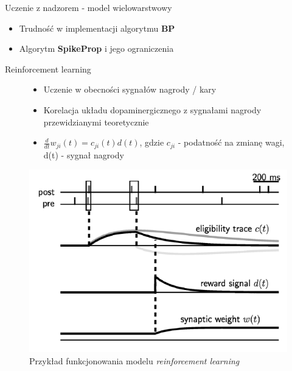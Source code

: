 \documentclass{beamer}
\begin{document}
\begin{frame}{Uczenie z nadzorem - model wielowarstwowy}
\begin{itemize}
	\item Trudność w implementacji algorytmu \textbf{BP}
	\item Algorytm \textbf{SpikeProp} i jego ograniczenia
\end{itemize}
\end{frame}

\begin{frame}{Reinforcement learning}

	\begin{figure}[ht]
		\begin{minipage}{0.48\linewidth}
			\begin{itemize}
				\item Uczenie w obecności sygnałów nagrody / kary
				\item Korelacja układu dopaminergicznego z sygnałami nagrody przewidzianymi teoretycznie
				\item $\frac{d}{dt}w_{ji}(t) = c_{ji}(t)d(t)$, gdzie $c_{ji}$ - podatność na zmianę wagi, d(t) - sygnał nagrody 
			\end{itemize}
		\end{minipage}
		\hfill
		\begin{minipage}{0.48\linewidth}
		\centering
		\includegraphics[width=\textwidth]{reinforcement.png}
		\caption{Przykład funkcjonowania modelu \textit{reinforcement learning}}
		\end{minipage}
	\end{figure}

\end{frame}
\end{document}
